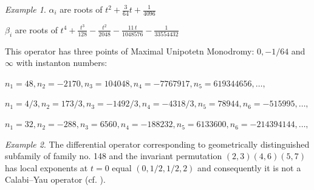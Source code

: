 \documentclass[12pt]{amsart}
\theoremstyle{plain}
\theoremstyle{remark}
\newtheorem{exmp}{Example}
\theoremstyle{definition}
\numberwithin{table}{section}
\begin{document}
\begin{exmp}
$\alpha_{i}$ are roots of $t^{2}+\frac3{64}t+\frac1{4096}$

$\beta_{i}$ are roots of ${t}^{4}+{\frac {{t}^{3}}{128}}-{\frac {{t}^{2}}{2048}}-{\frac {11\,t}{1048576}}-{\frac{1}{33554432}}$

This operator has three points of Maximal Unipotetn Monodromy: $0, -1/64$ and $\infty$ with instanton numbers:

$n_{1}=48, n_{2}=-2170, n_{3}=104048, n_{4}=-7767917, n_{5}=619344656,  \dots,$

$n_{1}=4/3, n_{2}=173/3, n_{3}=-1492/3, n_{4}=-4318/3, n_{5}=78944, n_{6}=-515995, \dots,$

$n_{1}=32, n_{2}=-288, n_{3}=6560, n_{4}=-188232, n_{5}=6133600, n_{6}=-214394144, \dots,$

\end{exmp}


\begin{exmp}
The differential operator corresponding to geometrically distinguished subfamily of family no. 148 and the invariant permutation $(2,3)(4,6)(5,7)$ has local exponents at $t=0$ equal $(0,1/2,1/2,2)$ and consequently it is not a Calabi--Yau operator (cf. \cite{AZ, vS}).

\end{exmp}
\end{document}
